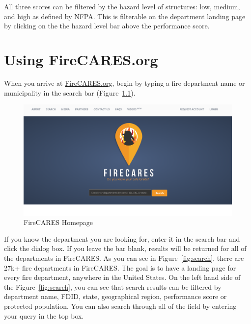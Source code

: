 \documentclass[12pt,oneside]{book}
\begin{document}
All three scores can be filtered by the hazard level of structures: low, medium, and high as defined by NFPA. This is filterable on the department landing page by clicking on the the hazard level bar above the performance score. 

\chapter{Using FireCARES.org}

When you arrive at \href{https://firecares.org}{FireCARES.org}, begin by typing a fire department name or municipality in the search bar (Figure~\ref{fig:homepage}). 

\begin{figure}[ht!]
\centering
\includegraphics[width=.9\columnwidth]{Figures/homepage}
\caption{FireCARES Homepage}
\label{fig:homepage}
\end{figure}

If you know the department you are looking for, enter it in the search bar and click the dialog box. If you leave the bar blank, results will be returned for all of the departments in FireCARES. As you can see in Figure~\ref{fig:search}, there are 27k+ fire departments in FireCARES. The goal is to have a landing page for every fire department, anywhere in the United States. On the left hand side of the Figure~\ref{fig:search}, you can see that search results can be filtered by department name, FDID, state, geographical region, performance score or protected population. You can also search through all of the field by entering your query in the top box.
\end{document}
